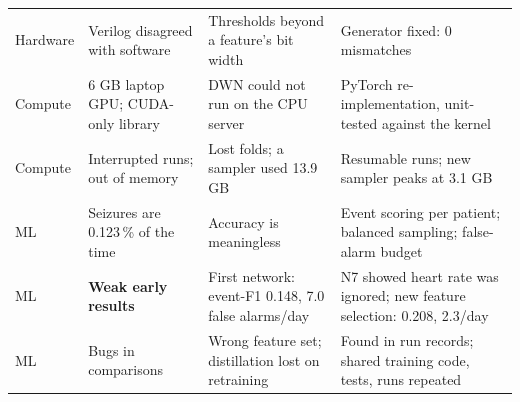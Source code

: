 \begin{xltabular}{\textwidth}{@{}P{17mm}P{40mm}LL@{}}
\small Hardware & \small Verilog disagreed with software & \small Thresholds beyond a feature's bit width & \small
Generator fixed: 0 mismatches\\
\small Compute & \small 6 GB laptop GPU; CUDA-only library & \small DWN could not run on the CPU server & \small
PyTorch re-implementation, unit-tested against the kernel\\
\small Compute & \small Interrupted runs; out of memory & \small Lost folds; a sampler used 13.9 GB & \small Resumable
runs; new sampler peaks at 3.1 GB\\
\small ML & \small Seizures are 0.123\,\% of the time & \small Accuracy is meaningless & \small Event scoring per
patient; balanced sampling; false-alarm budget\\
\small ML & \small \textbf{Weak early results} & \small First network: event-F1 0.148, 7.0 false alarms/day & \small
N7 showed heart rate was ignored; new feature selection: 0.208, 2.3/day\\
\small ML & \small Bugs in comparisons & \small Wrong feature set; distillation lost on retraining & \small Found in
run records; shared training code, tests, runs repeated\\
\end{xltabular}
